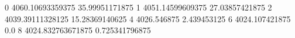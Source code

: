 0 4060.10693359375 35.99951171875
1 4051.14599609375 27.03857421875
2 4039.39111328125 15.28369140625
4 4026.546875 2.439453125
6 4024.107421875 0.0
8 4024.832763671875 0.725341796875
